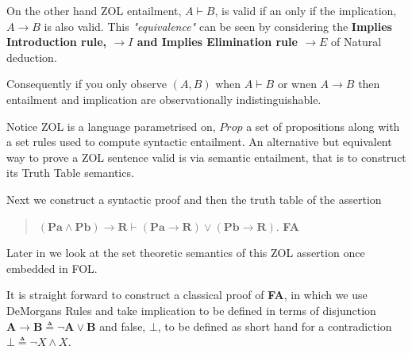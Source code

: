 On the other hand  ZOL entailment, $A\vdash B$, is valid if an only if   the implication, $A\rightarrow B$ is also valid.   This \emph{"equivalence"} can be seen by considering the {\bf Implies Introduction rule, $\rightarrow I$ and Implies Elimination rule $\rightarrow E$} of Natural deduction.
 
 \begin{center}\begin{minipage}{1in}
\begin{prooftree}
 
\end{prooftree}
\end{minipage}\quad
\begin{minipage}{1in}
\begin{prooftree}
 
\end{prooftree}
\end{minipage}\end{center}

\noindent Consequently if you only observe  $(A,B)$ when $A\vdash B$ or wnen $A\rightarrow B$ then entailment and implication are observationally indistinguishable.
 
   
Notice ZOL is a language parametrised on, $Prop$  a set of propositions along with a set rules used to compute syntactic entailment. An alternative but equivalent way to prove a ZOL sentence valid is via semantic entailment, that is to construct its Truth Table semantics. 



Next we construct a syntactic proof and then the truth table of the assertion 
\begin{quotation}
{\bf  $\mathbf{(Pa\wedge Pb)   \rightarrow R}\vdash \mathbf{(Pa\rightarrow R)\vee (Pb\rightarrow R)}$}. \hspace{\fill} {\bf FA}
\end{quotation}
 Later in  we look at the set theoretic semantics of this ZOL assertion once embedded in FOL.

It is straight forward to   construct a  classical proof of {\bf FA}, in which we use DeMorgans Rules and take implication to be defined in terms of disjunction 
$\mathbf{A \rightarrow B \triangleq \neg A \vee B}$ and false, $\bot$, to be defined  as short hand for a contradiction $\bot \triangleq  \neg X \wedge X$.

